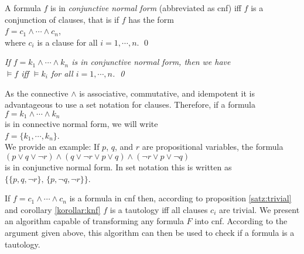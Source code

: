 \begin{Definition}  
A formula $f$ is  in \emph{conjunctive normal form} (abbreviated as cnf)
iff $f$ is a conjunction of clauses, that is if $f$ has the form \\[0.2cm]
\hspace*{1.3cm} $f = c_1 \wedge \cdots \wedge c_n$, \\[0.2cm]
where  $c_i$ is a clause for all $i=1,\cdots,n$. \qed
\end{Definition}

\noindent
\begin{Corollary} \label{korollar:knf}
{\em
If $f = k_1 \wedge \cdots \wedge k_n$ is in conjunctive normal form, then we have \\[0.2cm]
\hspace*{1.3cm} $\models f$ \quad iff \quad $\models k_i$ \quad for all $i=1,\cdots,n$. \qed
}
\end{Corollary}

\noindent
As the connective $\wedge$ is associative, commutative, and idempotent it is
advantageous to use a set notation for clauses.  Therefore, if a formula
\\[0.2cm]
\hspace*{1.3cm} $f = k_1 \wedge \cdots \wedge k_n$
\\[0.2cm]
is in connective normal form, we will write \\[0.2cm]
\hspace*{1.3cm} $f = \{ k_1, \cdots, k_n \}$. 
\\[0.2cm]
We provide an example:  If $p$, $q$, and $r$ are propositional variables, the formula
\\[0.2cm]
\hspace*{1.3cm}
$(p \vee q \vee \neg r) \wedge (q \vee \neg r \vee p \vee q)\wedge (\neg r \vee p \vee \neg q)$
\\[0.2cm]
is in conjunctive normal form.  In set notation this is written as
\\[0.2cm]
\hspace*{1.3cm}
$\bigl\{ \{p, q, \neg r \},\, \{ p, \neg q, \neg r \} \bigr\}$.
\vspace*{0.2cm}

If  $f = c_1 \wedge \cdots \wedge c_n$ is a formula in cnf then, according to proposition
 \ref{satz:trivial} and corollary \ref{korollar:knf} $f$ is a tautology iff all clauses $c_i$  
are trivial.  We present an algorithm capable of transforming any formula $F$ into cnf.
According to the argument given above, this algorithm can then be used to check if a formula is a
tautology. 

